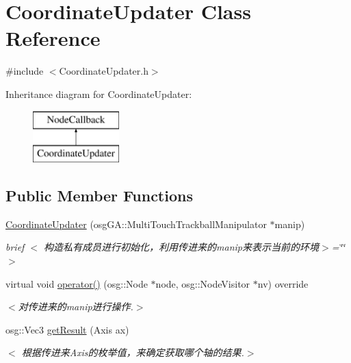 \hypertarget{class_coordinate_updater}{}\section{Coordinate\+Updater Class Reference}
\label{class_coordinate_updater}


{\ttfamily \#include $<$Coordinate\+Updater.\+h$>$}

Inheritance diagram for Coordinate\+Updater\+:\begin{figure}[H]
\begin{center}
\leavevmode
\includegraphics[height=2.000000cm]{class_coordinate_updater}
\end{center}
\end{figure}
\subsection*{Public Member Functions}
\begin{DoxyCompactItemize}
\item 
\hyperlink{class_coordinate_updater_afb57ab6d123b7c37fb22b98d212c6be9}{Coordinate\+Updater} (osg\+G\+A\+::\+Multi\+Touch\+Trackball\+Manipulator $\ast$manip)
\begin{DoxyCompactList}\small\item\em brief $<$ 构造私有成员进行初始化，利用传进来的manip来表示当前的环境$>$=\char`\"{}\char`\"{}$>$ \end{DoxyCompactList}\item 
virtual void \hyperlink{class_coordinate_updater_af67e8d382ffd471a058102d35cbd988c}{operator()} (osg\+::\+Node $\ast$node, osg\+::\+Node\+Visitor $\ast$nv) override
\begin{DoxyCompactList}\small\item\em $<$对传进来的manip进行操作.$>$ \end{DoxyCompactList}\item 
osg\+::\+Vec3 \hyperlink{class_coordinate_updater_ae9125c8a126d0e98b0dd6711b37f6876}{get\+Result} (Axis ax)
\begin{DoxyCompactList}\small\item\em $<$ 根据传进来\+Axis的枚举值，来确定获取哪个轴的结果.$>$ \end{DoxyCompactList}\end{DoxyCompactItemize}


